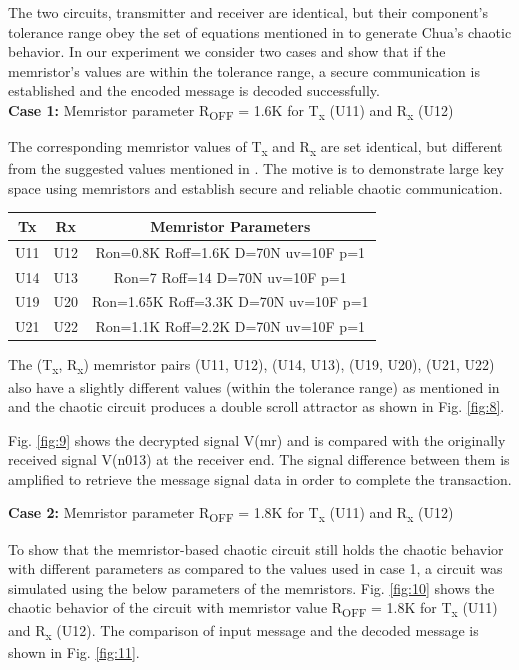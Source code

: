The two circuits, transmitter and receiver are identical, but their component's tolerance range obey the set of equations mentioned in \cite{chua1971memristor} to generate Chua's chaotic behavior. In our experiment we consider two cases and show that if the memristor's values are within the tolerance range, a secure communication is established and the encoded message is decoded successfully.  
\newline
\\
\textbf{Case 1:} Memristor parameter R\textsubscript{OFF} = 1.6K for T\textsubscript{x} (U11) and R\textsubscript{x} (U12)

The corresponding memristor values of T\textsubscript{x} and R\textsubscript{x} are set identical, but different from the suggested values mentioned in \cite{chua1971memristor}. The motive is to demonstrate large key space using memristors and establish secure and reliable chaotic communication.

\begin{center}
\small
\begin{tabular}{|c c c |} 
 \hline
 Tx & Rx & Memristor Parameters \\ [0.5ex] 
 \hline\hline
 U11 & U12 & Ron=0.8K Roff=1.6K D=70N uv=10F p=1 \\ 
 \hline
 U14 & U13 & Ron=7 Roff=14 D=70N uv=10F p=1 \\ 
 \hline
 U19 & U20 & Ron=1.65K Roff=3.3K D=70N uv=10F p=1 \\ 
 \hline
 U21 & U22 & Ron=1.1K Roff=2.2K D=70N uv=10F p=1 \\ 
 \hline
\end{tabular}
\end{center} 

The (T\textsubscript{x}, R\textsubscript{x}) memristor pairs (U11, U12), (U14, U13), (U19, U20), (U21, U22) also have a slightly different values (within the tolerance range) as mentioned in \cite{biolek2009spice} and the chaotic circuit produces a double scroll attractor as shown in Fig. \ref{fig:8}. 

Fig. \ref{fig:9} shows the decrypted signal V(mr) and is compared with the originally received signal V(n013) at the receiver end. The signal difference between them is amplified to retrieve the message signal data in order to complete the transaction. 

\textbf{Case 2:} Memristor parameter R\textsubscript{OFF} = 1.8K for T\textsubscript{x} (U11) and R\textsubscript{x} (U12)

To show that the memristor-based chaotic circuit still holds the chaotic behavior with different parameters as compared to the values used in case 1, a circuit was simulated using the below parameters of the memristors. Fig. \ref{fig:10} shows the chaotic behavior of the circuit with memristor value R\textsubscript{OFF} = 1.8K for T\textsubscript{x} (U11) and R\textsubscript{x} (U12). The comparison of input message and the decoded message is shown in Fig. \ref{fig:11}.  

